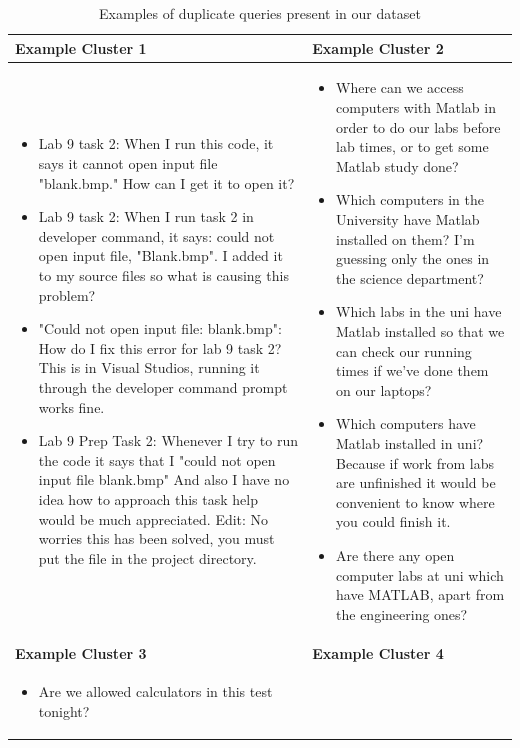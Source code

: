 \begin{table}[H]
\centering
\caption{Examples of duplicate queries present in our dataset}
\label{tab:dup_queries}
\begin{tabularx}{\textwidth}{X X}
\toprule
\textbf{Example Cluster 1} & \textbf{Example Cluster 2} \\
\midrule
\begin{itemize}
\item Lab 9 task 2: When I run this code, it says it cannot open input file "blank.bmp." How can I get it to open it?
\item Lab 9 task 2: When I run task 2 in developer command, it says: could not open input file, "Blank.bmp". I added it to my source files so what is causing this problem?
\item "Could not open input file: blank.bmp": How do I fix this error for lab 9 task 2? This is in Visual Studios, running it through the developer command prompt works fine.
\item Lab 9 Prep Task 2: Whenever I try to run the code it says that I "could not open input file blank.bmp" And also I have no idea how to approach this task help would be much appreciated. Edit: No worries this has been solved, you must put the file in the project directory.
\end{itemize}
&
\begin{itemize}
\item Where can we access computers with Matlab in order to do our labs before lab times, or to get some Matlab study done?
\item Which computers in the University have Matlab installed on them? I'm guessing only the ones in the science department?
\item Which labs in the uni have Matlab installed so that we can check our running times if we've done them on our laptops?
\item Which computers have Matlab installed in uni? Because if work from labs are unfinished it would be convenient to know where you could finish it.
\item Are there any open computer labs at uni which have MATLAB, apart from the engineering ones?
\end{itemize} \\
\midrule
\textbf{Example Cluster 3} & \textbf{Example Cluster 4} \\
\midrule
\begin{itemize}
\item Are we allowed calculators in this test tonight?

\end{itemize}
\end{tabularx}
\end{table}
